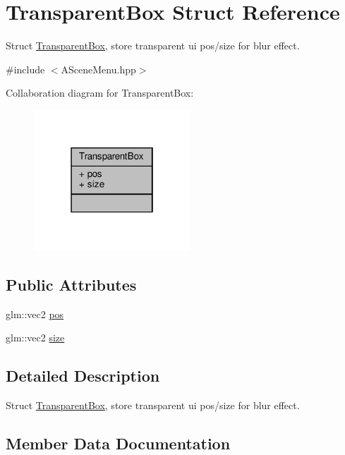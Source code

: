 \hypertarget{struct_transparent_box}{}\section{Transparent\+Box Struct Reference}
\label{struct_transparent_box}


Struct \hyperlink{struct_transparent_box}{Transparent\+Box}, store transparent ui pos/size for blur effect.  




{\ttfamily \#include $<$A\+Scene\+Menu.\+hpp$>$}



Collaboration diagram for Transparent\+Box\+:
\nopagebreak
\begin{figure}[H]
\begin{center}
\leavevmode
\includegraphics[width=166pt]{struct_transparent_box__coll__graph}
\end{center}
\end{figure}
\subsection*{Public Attributes}
\begin{DoxyCompactItemize}
\item 
glm\+::vec2 \hyperlink{struct_transparent_box_a5f98601932b549eada38e339bac59024}{pos}
\item 
glm\+::vec2 \hyperlink{struct_transparent_box_aef4c059d7995f35b350071485cb35486}{size}
\end{DoxyCompactItemize}


\subsection{Detailed Description}
Struct \hyperlink{struct_transparent_box}{Transparent\+Box}, store transparent ui pos/size for blur effect. 

\subsection{Member Data Documentation}
\mbox{\label{struct_transparent_box_a5f98601932b549eada38e339bac59024}} 
